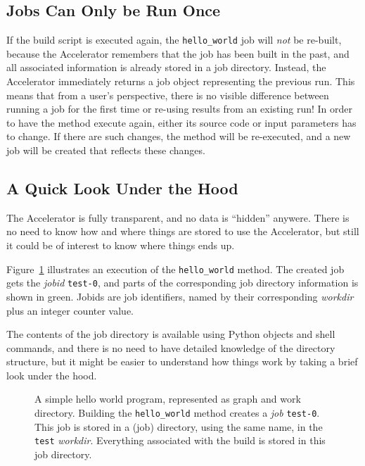 \subsection{Jobs Can Only be Run Once}
If the build script is executed again, the \texttt{hello\_world} job
will \emph{not} be re-built, because the Accelerator remembers that
the job has been built in the past, and all associated information is
already stored in a job directory.  Instead, the Accelerator
immediately returns a job object representing the previous run.  This
means that from a user's perspective, there is no visible difference
between running a job for the first time or re-using results from an
existing run!  In order to have the method execute again, either its
source code or input parameters has to change.  If there are such
changes, the method will be re-executed, and a new job will be created
that reflects these changes.


\subsection{A Quick Look Under the Hood}
The Accelerator is fully transparent, and no data is ``hidden''
anywere.  There is no need to know how and where things are stored to
use the Accelerator, but still it could be of interest to know where
things ends up.

Figure~\ref{fig:execflow-hello-world} illustrates an execution of the
\texttt{hello\_world} method.  The created job gets the \textsl{jobid}
\texttt{test-0}, and parts of the corresponding job directory
information is shown in green.  Jobids are job identifiers, named by
their corresponding \textsl{workdir} plus an integer counter value.

The contents of the job directory is available using Python objects
and shell commands, and there is no need to have detailed knowledge of
the directory structure, but it might be easier to understand how
things work by taking a brief look under the hood.
\clearpage

\begin{figure}[t]
  \hspace{1.5cm}
    \caption{A simple hello world program, represented as graph and
      work directory.  Building the \texttt{hello\_world} method
      creates a \emph{job} \texttt{test-0}.  This job is stored in a
      (job) directory, using the same name, in the \texttt{test}
      \emph{workdir}.  Everything associated with the build is stored
      in this job directory.}
    \label{fig:execflow-hello-world}
\end{figure}

